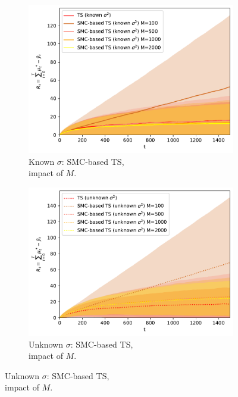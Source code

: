 \begin{figure}[!h]
	\begin{subfigure}[b]{0.46\textwidth}
		\centering
		\includegraphics[width=\textwidth]{./fods_figs/static/linear_gaussian/A2/theta-0.1_-0.1_0.1_0.1_sigma0.5_0.5_allM_cumulative_regret_ts_knownsigma}
		\caption{Known $\sigma$: SMC-based TS, \\ impact of $M$.}
	\end{subfigure}
	\begin{subfigure}[b]{0.46\textwidth}
		\centering
		\includegraphics[width=\textwidth]{./fods_figs/static/linear_gaussian/A2/theta-0.1_-0.1_0.1_0.1_sigma0.5_0.5_allM_cumulative_regret_ts_unknownsigma}
		\caption{Unknown $\sigma$: SMC-based TS, \\ impact of $M$.}
	\end{subfigure}


\end{figure}
